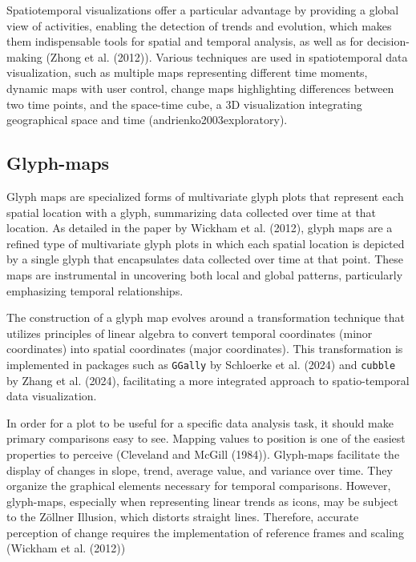 Spatiotemporal visualizations offer a particular advantage by providing a global view of activities, enabling the detection of trends and evolution, which makes them indispensable tools for spatial and temporal analysis, as well as for decision-making (Zhong et al. (2012)). Various techniques are used in spatiotemporal data visualization, such as multiple maps representing different time moments, dynamic maps with user control, change maps highlighting differences between two time points, and the space-time cube, a 3D visualization integrating geographical space and time (andrienko2003exploratory).

\subsection{Glyph-maps}\label{glyph-maps}

Glyph maps are specialized forms of multivariate glyph plots that represent each spatial location with a glyph, summarizing data collected over time at that location. As detailed in the paper by Wickham et al. (2012), glyph maps are a refined type of multivariate glyph plots in which each spatial location is depicted by a single glyph that encapsulates data collected over time at that point. These maps are instrumental in uncovering both local and global patterns, particularly emphasizing temporal relationships.

The construction of a glyph map evolves around a transformation technique that utilizes principles of linear algebra to convert temporal coordinates (minor coordinates) into spatial coordinates (major coordinates). This transformation is implemented in packages such as \texttt{GGally} by Schloerke et al. (2024) and \texttt{cubble} by Zhang et al. (2024), facilitating a more integrated approach to spatio-temporal data visualization.

In order for a plot to be useful for a specific data analysis task, it should make primary comparisons easy to see. Mapping values to position is one of the easiest properties to perceive (Cleveland and McGill (1984)). Glyph-maps facilitate the display of changes in slope, trend, average value, and variance over time. They organize the graphical elements necessary for temporal comparisons. However, glyph-maps, especially when representing linear trends as icons, may be subject to the Zöllner Illusion, which distorts straight lines. Therefore, accurate perception of change requires the implementation of reference frames and scaling (Wickham et al. (2012))

